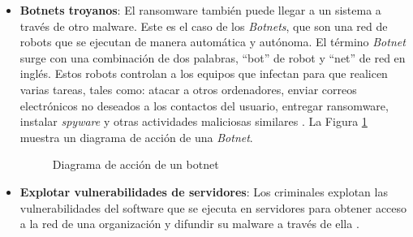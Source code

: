 \begin{itemize}
    \item \textbf{Botnets troyanos}: El ransomware también puede llegar a un sistema a través de otro malware. Este es el caso de los \textit{Botnets}, que son una red de robots que se ejecutan de manera automática y autónoma. El término \textit{Botnet} surge con una combinación de dos palabras, ``bot'' de robot y ``net'' de red en inglés. Estos robots controlan a los equipos que infectan para que realicen varias tareas, tales como: atacar a otros ordenadores, enviar correos electrónicos no deseados a los contactos del usuario, entregar ransomware, instalar \textit{spyware} y otras actividades maliciosas similares \cite {45}. La Figura \ref{fig:im8} muestra un diagrama de acción de una \textit{Botnet}.

    \begin{figure}[htb]
    \begin{center}
    {}
    \end{center}
    \caption{Diagrama de acción de un botnet}
    \label{fig:im8}
    \end{figure}

    \item \textbf{Explotar vulnerabilidades de servidores}: Los criminales explotan las vulnerabilidades del software que se ejecuta en servidores para obtener acceso a la red de una organización y difundir su malware a través de ella \cite{29}.


\end{itemize}
